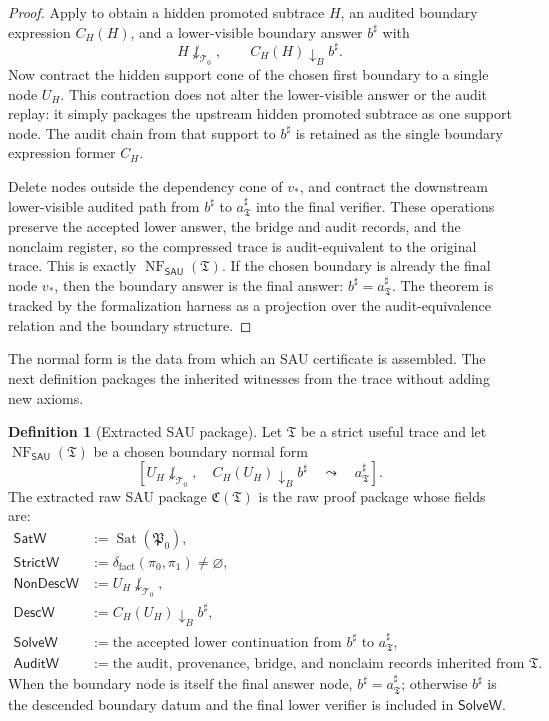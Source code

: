 \documentclass[11pt]{article}
\newcommand{\SAU}{\mathsf{SAU}}
\newcommand{\NF}{\operatorname{NF}}
\theoremstyle{definition}
\newtheorem{definition}[theorem]{Definition}
\begin{document}
\begin{proof}
Apply  to obtain a hidden promoted
subtrace \(H\), an audited boundary expression \(C_H(H)\), and a lower-visible
boundary answer \(b^\sharp\) with
\[
H\not\downarrow_{\mathcal T_0},
\qquad
C_H(H)\downarrow_B b^\sharp.
\]
Now contract the hidden support cone of the chosen first boundary to a single
node \(U_H\).  This contraction does not alter the lower-visible answer or the
audit replay: it simply packages the upstream hidden promoted subtrace as one
support node.  The audit chain from that support to \(b^\sharp\) is retained as
the single boundary expression former \(C_H\).

Delete nodes outside the dependency cone of \(v_\ast\), and contract the
downstream lower-visible audited path from \(b^\sharp\) to
\(a^\sharp_{\mathfrak T}\) into the final verifier.  These operations preserve
the accepted lower answer, the bridge and audit records, and the nonclaim
register, so the compressed trace is audit-equivalent to the original trace.
This is exactly \(\NF_{\SAU}(\mathfrak T)\).  If the chosen boundary is already
the final node \(v_\ast\), then the boundary answer is the final answer:
\(b^\sharp=a^\sharp_{\mathfrak T}\).  The theorem is tracked by the
formalization harness as a projection over the audit-equivalence relation and
the boundary structure.
\end{proof}

The normal form is the data from which an SAU certificate is assembled.  The
next definition packages the inherited witnesses from the trace without adding
new axioms.

\begin{definition}[Extracted SAU package]
\label{def:sau-extracted-package}
Let \(\mathfrak T\) be a strict useful trace and let \(\NF_{\SAU}(\mathfrak T)\) be a chosen boundary normal form
\[
\left[U_H\not\downarrow_{\mathcal T_0},
\quad
C_H(U_H)\downarrow_B b^\sharp
\quad\leadsto\quad
 a^\sharp_{\mathfrak T}\right].
\]
The extracted raw SAU package \(\mathfrak C(\mathfrak T)\) is the raw proof package whose fields are:
\begin{align*}
\mathsf{SatW}&:=\operatorname{Sat}(\mathfrak P_0),\\
\mathsf{StrictW}&:=\delta_{\mathrm{fact}}(\pi_0,\pi_1)\neq\varnothing,\\
\mathsf{NonDescW}&:=U_H\not\downarrow_{\mathcal T_0},\\
\mathsf{DescW}&:=C_H(U_H)\downarrow_B b^\sharp,\\
\mathsf{SolveW}&:=\text{the accepted lower continuation from }b^\sharp\text{ to }a^\sharp_{\mathfrak T},\\
\mathsf{AuditW}&:=\text{the audit, provenance, bridge, and nonclaim records inherited from }\mathfrak T.
\end{align*}
When the boundary node is itself the final answer node, \(b^\sharp=a^\sharp_{\mathfrak T}\); otherwise \(b^\sharp\) is the descended boundary datum and the final lower verifier is included in \(\mathsf{SolveW}\).
\end{definition}
\end{document}

